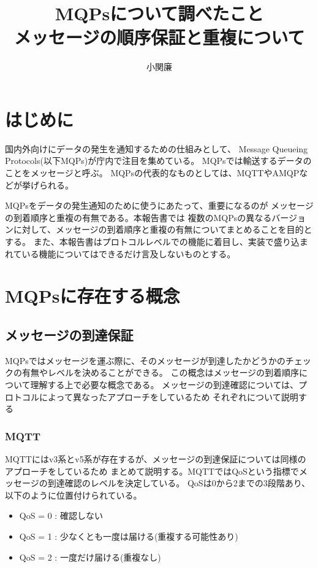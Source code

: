\documentclass[uplatex, twocolumn,10pt]{jsarticle}
\begin{document}
\title{\bf{\LARGE{MQPsについて調べたこと} \\ \Large{メッセージの順序保証と重複について}}}
\author{小関廉}
\date{}
\maketitle

\section{はじめに}

国内外向けにデータの発生を通知するための仕組みとして、
Message Queueing Protocols(以下MQPs)が庁内で注目を集めている。
MQPsでは輸送するデータのことをメッセージと呼ぶ。
MQPsの代表的なものとしては、MQTTやAMQPなどが挙げられる。

MQPsをデータの発生通知のために使うにあたって、重要になるのが
メッセージの到着順序と重複の有無である。本報告書では
複数のMQPsの異なるバージョンに対して、メッセージの到着順序と重複の有無についてまとめることを目的とする。
また、本報告書はプロトコルレベルでの機能に着目し、実装で盛り込まれている機能についてはできるだけ言及しないものとする。

\section{MQPsに存在する概念}

\subsection{メッセージの到達保証}

MQPsではメッセージを運ぶ際に、そのメッセージが到達したかどうかのチェックの有無やレベルを決めることができる。
この概念はメッセージの到着順序について理解する上で必要な概念である。
メッセージの到達確認については、プロトコルによって異なったアプローチをしているため
それぞれについて説明する

\subsubsection{MQTT}

MQTTにはv3系とv5系が存在するが、メッセージの到達保証については同様のアプローチをしているため
まとめて説明する。MQTTではQoSという指標でメッセージの到達確認のレベルを決定している。
QoSは0から2までの3段階あり、以下のように位置付けられている。

\begin{itemize}
    \item QoS = 0 : 確認しない
    \item QoS = 1 : 少なくとも一度は届ける(重複する可能性あり)
    \item QoS = 2 : 一度だけ届ける(重複なし)
\end{itemize}
\end{document}
